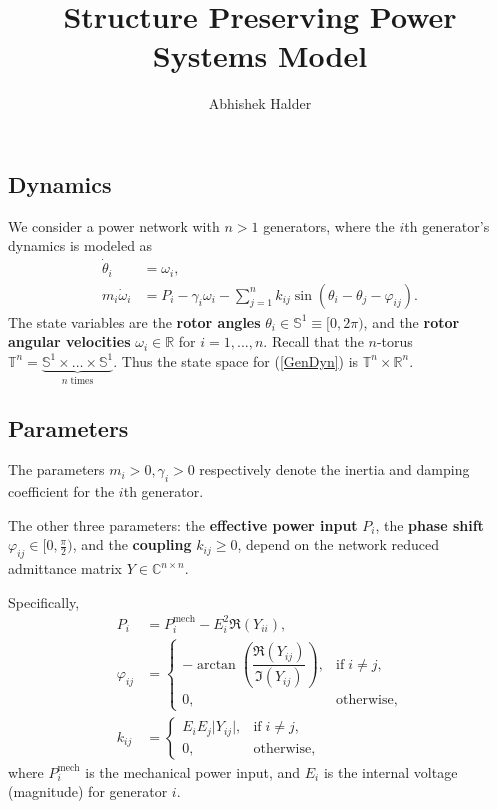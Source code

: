 \documentclass[a4paper,11pt]{article}
\title{Structure Preserving Power Systems Model}
\author{
  Abhishek Halder
}
\date{} %
\begin{document}
\maketitle

\subsection*{Dynamics}
We consider a power network with $n>1$ generators, where the $i$th generator's dynamics is modeled as
\begin{subequations}
\begin{align}
   \dot{\theta}_{i} &= \omega_{i},\\
   m_{i}\dot{\omega}_{i} &= P_{i} - \gamma_{i}\omega_{i} - \displaystyle\sum_{j=1}^{n}k_{ij}\sin(\theta_{i}-\theta_{j} - \varphi_{ij}).
\end{align}
\label{GenDyn}
\end{subequations}
The state variables are the \textbf{rotor angles} $\theta_{i}\in\mathbb{S}^{1}\equiv [0,2\pi)$, and the \textbf{rotor angular velocities} $\omega_{i}\in\mathbb{R}$ for $i=1,...,n$. Recall that the $n$-torus $\mathbb{T}^{n} = \underbrace{\mathbb{S}^{1} \times \hdots \times \mathbb{S}^{1}}_{n \; \text{times}}$. Thus the state space for (\ref{GenDyn}) is $\mathbb{T}^{n}\times\mathbb{R}^{n}$.

\subsection*{Parameters}
The parameters $m_{i}>0,\gamma_{i}>0$ respectively denote the inertia and damping coefficient for the $i$th generator. 

The other three parameters: the \textbf{effective power input} $P_{i}$, the \textbf{phase shift} $\varphi_{ij}\in[0,\frac{\pi}{2})$, and the \textbf{coupling} $k_{ij}\geq 0$, depend on the network reduced admittance matrix $Y\in\mathbb{C}^{n\times n}$. 

Specifically,
\begin{subequations}
\begin{align}
 P_{i} &= P_{i}^{\text{mech}} - E_{i}^{2} \Re\left(Y_{ii}\right), \\
 \varphi_{ij} &= \begin{cases} -\arctan\left(\dfrac{\Re\left(Y_{ij}\right)}{\Im\left(Y_{ij}\right)}\right), & \text{if}\;i\neq j,\\
 0, & \text{otherwise},
 \end{cases}\\
 k_{ij} &= \begin{cases} E_{i}E_{j} \vert Y_{ij}\vert, & \text{if}\;i\neq j,\\
 0, & \text{otherwise},
 \end{cases}
\end{align}
\end{subequations}
where $P_{i}^{\text{mech}}$ is the mechanical power input, and $E_{i}$ is the internal voltage (magnitude) for generator $i$.
\end{document}

